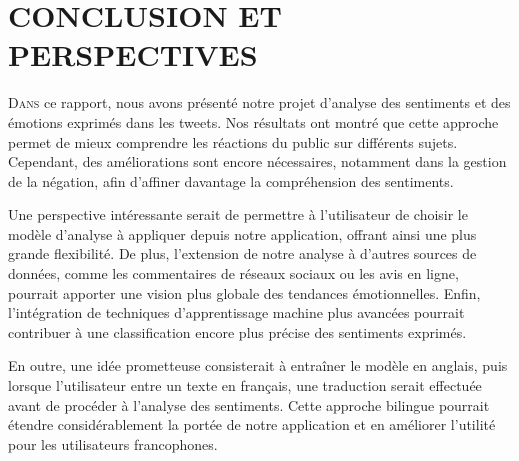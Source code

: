 \clearpage
{}
{}
\chapter*{CONCLUSION ET PERSPECTIVES}
\lettrine[lines=1,lraise=0.1,findent=0.6em]{D}{ans} ce rapport, nous avons présenté notre projet d'analyse des sentiments et des émotions exprimés dans les tweets. Nos résultats ont montré que cette approche permet de mieux comprendre les réactions du public sur différents sujets. Cependant, des améliorations sont encore nécessaires, notamment dans la gestion de la négation, afin d'affiner davantage la compréhension des sentiments.

Une perspective intéressante serait de permettre à l'utilisateur de choisir le modèle d'analyse à appliquer depuis notre application, offrant ainsi une plus grande flexibilité. De plus, l'extension de notre analyse à d'autres sources de données, comme les commentaires de réseaux sociaux ou les avis en ligne, pourrait apporter une vision plus globale des tendances émotionnelles. Enfin, l'intégration de techniques d'apprentissage machine plus avancées pourrait contribuer à une classification encore plus précise des sentiments exprimés.

En outre, une idée prometteuse consisterait à entraîner le modèle en anglais, puis lorsque l'utilisateur entre un texte en français, une traduction serait effectuée avant de procéder à l'analyse des sentiments. Cette approche bilingue pourrait étendre considérablement la portée de notre application et en améliorer l'utilité pour les utilisateurs francophones.


